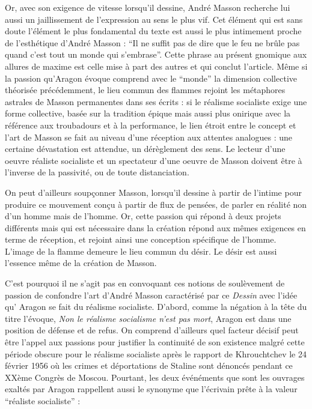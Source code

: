 	Or, avec son exigence de vitesse lorsqu’il dessine, André Masson recherche lui aussi un jaillissement de l’expression au sens le plus vif. Cet élément qui est sans doute l’élément le plus fondamental du texte est aussi le plus intimement proche de l’esthétique d’André Masson : \enquote{Il ne suffit pas de dire que le feu ne brûle pas quand c’est tout un monde qui s’embrase}. Cette phrase au présent gnomique aux allures de maxime est celle mise à part des autres et qui conclut l’article. Même si la passion qu’Aragon évoque comprend avec le \enquote{monde} la dimension collective théorisée précédemment, le lieu commun des flammes rejoint les métaphores astrales de Masson permanentes dans ses écrits : si le réalisme socialiste exige une forme collective, basée sur la tradition épique mais aussi plus onirique avec la référence aux troubadours et à la performance, le lien étroit entre le concept et l’art de Masson se fait au niveau d’une réception aux attentes analogues : une certaine dévastation est attendue, un dérèglement des sens. Le lecteur d’une oeuvre réaliste socialiste et un spectateur d’une oeuvre de Masson doivent être à l’inverse de la passivité, ou de toute distanciation. 

	On peut d’ailleurs soupçonner Masson, lorsqu'il dessine à partir de l’intime pour produire ce mouvement conçu à partir de flux de pensées, de parler en réalité non d’un homme mais de l’homme. Or, cette passion qui répond à deux projets différents mais qui est nécessaire dans la création répond aux mêmes exigences en terme de réception, et rejoint ainsi une conception spécifique de l’homme. L’image de la flamme demeure le lieu commun du désir. Le désir est aussi l’essence même de la création de Masson. 

C’est pourquoi il ne s’agit pas en convoquant ces notions de soulèvement de passion de confondre l’art d’André Masson caractérisé par ce \emph{Dessin} avec l’idée qu' Aragon se fait du réalisme socialiste. D’abord, comme la négation à la tête du titre l’évoque, \emph{Non le réalisme socialisme n’est pas mort}, Aragon est dans une position de défense et de refus. On comprend d’ailleurs quel facteur décisif peut être l’appel aux passions pour justifier la continuité de son existence malgré cette période obscure pour le réalisme socialiste après le rapport de Khrouchtchev le 24 février 1956 où les crimes et déportations de Staline sont dénoncés pendant ce XXème Congrès de Moscou. Pourtant, les deux événéments que sont les ouvrages exaltés par Aragon rappellent aussi le synonyme que l'écrivain prête à la valeur \enquote{réaliste socialiste} :  

